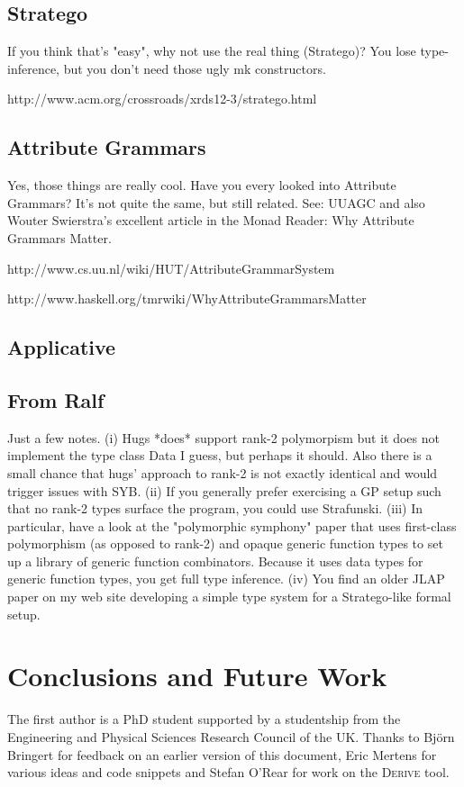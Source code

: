 \documentclass[preprint]{sigplanconf}
\begin{document}
\subsection{Stratego}

If you think that's "easy", why not use the real thing (Stratego)? You lose type-inference, but you don't need those ugly mk constructors.

http://www.acm.org/crossroads/xrds12-3/stratego.html

\subsection{Attribute Grammars}

Yes, those things are really cool. Have you every looked into Attribute Grammars? It's not quite the same, but still related. See: UUAGC and also Wouter Swierstra's excellent article in the Monad Reader: Why Attribute Grammars Matter.

http://www.cs.uu.nl/wiki/HUT/AttributeGrammarSystem

http://www.haskell.org/tmrwiki/WhyAttributeGrammarsMatter

\subsection{Applicative}

\subsection{From Ralf}

Just a few notes. (i) Hugs *does* support rank-2 polymorpism but it does not implement the type class Data I guess, but perhaps it should. Also there is a small chance that hugs' approach to rank-2 is not exactly identical and would trigger issues with SYB. (ii) If you generally prefer exercising a GP setup such that no rank-2 types surface the program, you could use Strafunski. (iii) In particular, have a look at the "polymorphic symphony" paper that uses first-class polymorphism (as opposed to rank-2) and opaque generic function types to set up a library of generic function combinators. Because it uses data types for generic function types, you get full type inference. (iv) You find an older JLAP paper on my web site developing a simple type system for a Stratego-like formal setup.

\section{Conclusions and Future Work}

\acks

The first author is a PhD student supported by a studentship from the Engineering and Physical Sciences Research Council of the UK. Thanks to Bj\"{o}rn Bringert for feedback on an earlier version of this document, Eric Mertens for various ideas and code snippets and Stefan O'Rear for work on the \textsc{Derive} tool.



\end{document}
